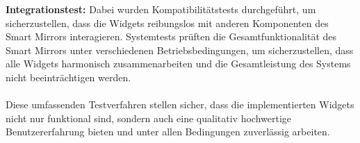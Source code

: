 \noindent
\textbf{Integrationstest:} Dabei wurden Kompatibilitätstests durchgeführt, um sicherzustellen, dass die Widgets reibungslos mit anderen Komponenten des Smart Mirrors interagieren. Systemtests prüften die Gesamtfunktionalität des Smart Mirrors unter verschiedenen Betriebsbedingungen, um sicherzustellen, dass alle Widgets harmonisch zusammenarbeiten und die Gesamtleistung des Systems nicht beeinträchtigen werden. \\ \\
\noindent
Diese umfassenden Testverfahren stellen sicher, dass die implementierten Widgets nicht nur funktional sind, sondern auch eine qualitativ hochwertige Benutzererfahrung bieten und unter allen Bedingungen zuverlässig arbeiten.



